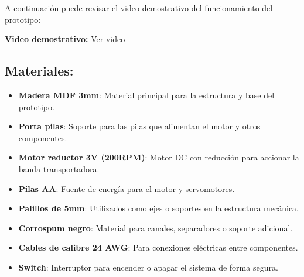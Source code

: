 A continuación puede revisar el video demostrativo del funcionamiento del prototipo:

\begin{center}
    \textbf{Video demostrativo:}  
    \href{https://utpedupe-my.sharepoint.com/:v:/g/personal/u22233575_utp_edu_pe/ESdkn_1TnllGkt0cGerWwMgBXVQGKYCcalTcEf6V_v72PA?nav=eyJyZWZlcnJhbEluZm8iOnsicmVmZXJyYWxBcHAiOiJPbmVEcml2ZUZvckJ1c2luZXNzIiwicmVmZXJyYWxBcHBQbGF0Zm9ybSI6IldlYiIsInJlZmVycmFsTW9kZSI6InZpZXciLCJyZWZlcnJhbFZpZXciOiJNeUZpbGVzTGlua0NvcHkifX0&e=CYh8pB }{Ver video}
\end{center}

\subsection{Materiales:}

\begin{itemize}
    \item \textbf{Madera MDF 3mm}: Material principal para la estructura y base del prototipo.
    \item \textbf{Porta pilas}: Soporte para las pilas que alimentan el motor y otros componentes.
    \item \textbf{Motor reductor 3V (200RPM)}: Motor DC con reducción para accionar la banda transportadora.
    \item \textbf{Pilas AA}: Fuente de energía para el motor y servomotores.
    \item \textbf{Palillos de 5mm}: Utilizados como ejes o soportes en la estructura mecánica.
    \item \textbf{Corrospum negro}: Material para canales, separadores o soporte adicional.
    \item \textbf{Cables de calibre 24 AWG}: Para conexiones eléctricas entre componentes.
    \item \textbf{Switch}: Interruptor para encender o apagar el sistema de forma segura.
\end{itemize}




